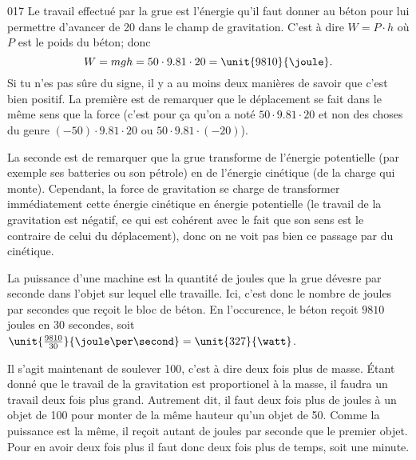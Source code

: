 

\begin{corrige}{017}
Le travail effectué par la grue est l'énergie qu'il faut donner au béton pour lui permettre d'avancer de \unit{20}{\meter} dans le champ de gravitation. C'est à dire $W=P\cdot h$ où $P$ est le poids du béton; donc
\[ 
  W=mgh=50\cdot 9.81\cdot 20=\unit{9810}{\joule}.
\]
Si tu n'es pas sûre du signe, il y a au moins deux manières de savoir que c'est bien positif. La première est de remarquer que le déplacement se fait dans le même sens que la force (c'est pour ça qu'on a noté $50\cdot 9.81\cdot 20$ et non des choses du genre $(-50)\cdot 9.81\cdot 20$ ou $50\cdot9.81\cdot (-20)$).

La seconde est de remarquer que la grue transforme de l'énergie potentielle (par exemple ses batteries ou son pétrole) en de l'énergie cinétique (de la charge qui monte). Cependant, la force de gravitation se charge de transformer immédiatement cette énergie cinétique en énergie potentielle (le travail de la gravitation est négatif, ce qui est cohérent avec le fait que son sens est le contraire de celui du déplacement), donc on ne \og voit\fg{} pas bien ce passage par du cinétique.

La puissance d'une machine est la quantité de joules que la grue dévesre par seconde dans l'objet sur lequel elle travaille. Ici, c'est donc le nombre de joules par secondes que reçoit le bloc de béton. En l'occurence, le béton reçoit $9810$ joules en $30$ secondes, soit $\unit{\frac{9810 }{ 30 }}{\joule\per\second}=\unit{327}{\watt}$.

Il s'agit maintenant de soulever \unit{100}{\kilogram}, c'est à dire deux fois plus de masse. Étant donné que le travail de la gravitation est proportionel à la masse, il faudra un travail deux fois plus grand. Autrement dit, il faut deux fois plus de joules à un objet de \unit{100}{\kilogram} pour monter de la même hauteur qu'un objet de \unit{50}{\kilogram}. Comme la puissance est la même, il reçoit autant de joules par seconde que le premier objet. Pour en avoir deux fois plus il faut donc deux fois plus de temps, soit une minute.

\end{corrige}

